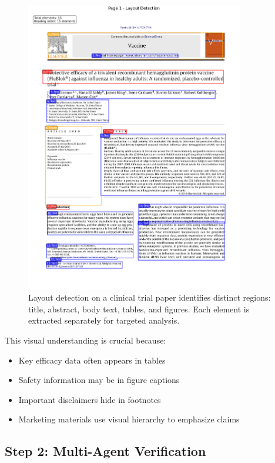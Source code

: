 \documentclass[11pt]{article}
\begin{document}
\begin{figure}[htbp]
\centering
\includegraphics[width=0.85\textwidth]{scientific_layout_example.png}
\caption{Layout detection on a clinical trial paper identifies distinct regions: title, abstract, body text, tables, and figures. Each element is extracted separately for targeted analysis.}
\end{figure}

This visual understanding is crucial because:
\begin{itemize}
\item Key efficacy data often appears in tables
\item Safety information may be in figure captions
\item Important disclaimers hide in footnotes
\item Marketing materials use visual hierarchy to emphasize claims
\end{itemize}

\subsection{Step 2: Multi-Agent Verification}
\end{document}
